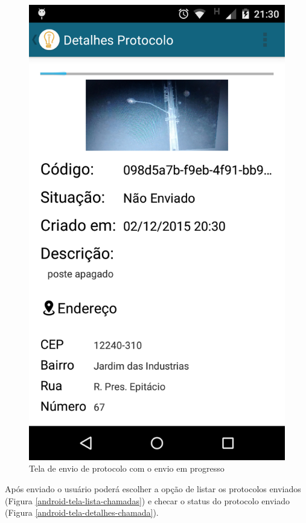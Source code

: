 \documentclass[
	article,			%
	11pt,				%
	oneside,			%
	a4paper,			%
	english,			%
	brazil,				%
	sumario=tradicional
	]{abntex2}
\begin{document}
\begin{figure}[!htbp]
\begin{minipage}{0.4\textwidth}
    \centering
    \caption{\label{android-tela-enviando}Tela de envio de protocolo com o envio em progresso}
    \includegraphics[scale=0.1]{android/6.png}
  \end{minipage}
\end{figure}

Após enviado o usuário poderá escolher a opção de listar os protocolos enviados (Figura \ref{android-tela-lista-chamadas}) e checar o status do protocolo enviado (Figura \ref{android-tela-detalhes-chamada}).
\end{document}
